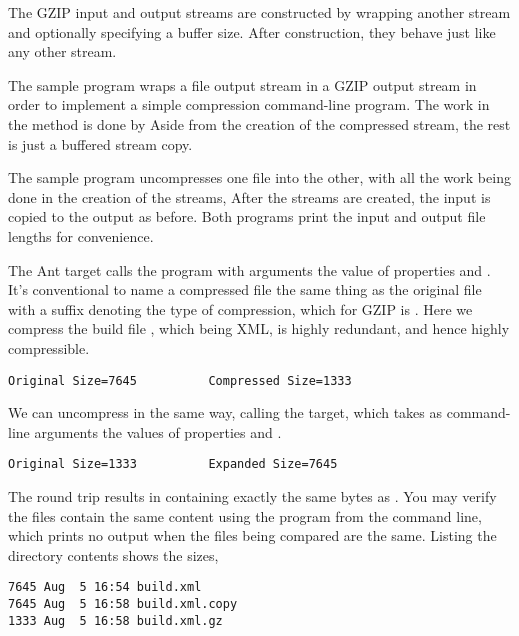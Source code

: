 The GZIP input and output streams are constructed by wrapping another
stream and optionally specifying a buffer size.  After construction,
they behave just like any other stream. 

The sample program  wraps a file output
stream in a GZIP output stream in order to implement
a simple compression command-line program.  The work
in the  method is done by
%
%
Aside from the creation of the compressed stream, the
rest is just a buffered stream copy.  

The sample program  uncompresses one
file into the other, with all the work being done in
the creation of the streams,
%
%
After the streams are created, the input is copied to the output as
before.  Both programs print the input and output file lengths
for convenience.

The Ant target  calls the program with arguments
the value of properties  and .
It's conventional to name a compressed file the same thing as the
original file with a suffix denoting the type of compression,
which for GZIP is . Here we compress the build file
, which being XML, is highly redundant, and hence
highly compressible.
%
\begin{verbatim}
Original Size=7645          Compressed Size=1333 
\end{verbatim}
%
We can uncompress in the same way, calling the 
target, which takes as command-line arguments the values of properties
 and .
%
\begin{verbatim}
Original Size=1333          Expanded Size=7645
\end{verbatim}
%
The round trip results in  containing exactly the
same bytes as .  You may verify the files contain the
same content using the  program from the command line,
%
%
which prints no output when the files being compared are the same.
Listing the directory contents shows the sizes,
%
\begin{verbatim}
7645 Aug  5 16:54 build.xml        
7645 Aug  5 16:58 build.xml.copy
1333 Aug  5 16:58 build.xml.gz
\end{verbatim}

